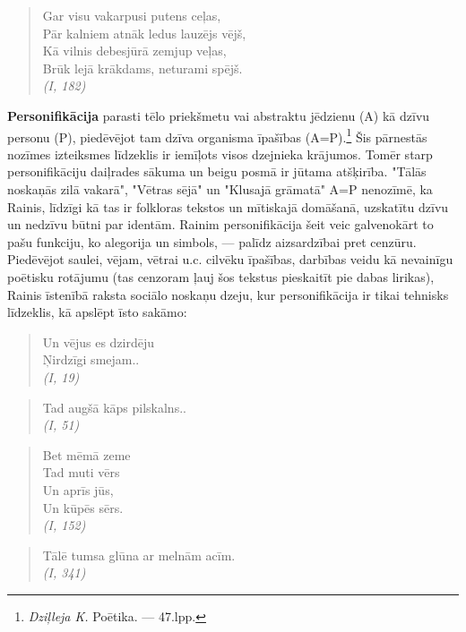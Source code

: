 \documentclass[11pt]{article}
\begin{document}
\begin{quote}
Gar visu vakarpusi putens ceļas,\\
Pār kalniem atnāk ledus lauzējs vējš,\\
Kā vilnis debesjūrā zemjup veļas,\\
Brūk lejā krākdams, neturami spējš.\\
{\em (I, 182)}
\end{quote}

{\color{red}
{\bf Personifikācija} parasti tēlo priekšmetu vai abstraktu
jēdzienu (A) kā dzīvu personu (P), piedēvējot
tam dzīva organisma īpašības (A=P).\footnote{{\em Dziļleja K.}
Poētika. --- 47.lpp.} Šis pārnestās nozīmes
izteiksmes līdzeklis ir iemīļots visos dzejnieka krājumos.
Tomēr starp personifikāciju daiļrades sākuma un beigu
posmā ir jūtama atšķirība. "Tālās noskaņās zilā vakarā",
"Vētras sējā" un "Klusajā grāmatā" A=P nenozīmē, ka
Rainis, līdzīgi kā tas ir folkloras tekstos un mītiskajā
domāšanā, uzskatītu dzīvu un nedzīvu būtni par identām.
Rainim personifikācija šeit veic galvenokārt to pašu funkciju,
ko alegorija un simbols, --- palīdz aizsardzībai pret
cenzūru. Piedēvējot saulei, vējam, vētrai u.c.
cilvēku īpašības, darbības veidu kā nevainīgu poētisku
rotājumu (tas cenzoram ļauj šos tekstus pieskaitīt pie
dabas lirikas), Rainis īstenībā raksta sociālo noskaņu dzeju,
kur personifikācija ir tikai tehnisks līdzeklis, kā
apslēpt īsto sakāmo:

\begin{quote}
Un vējus es dzirdēju\\
Ņirdzīgi smejam..\\
{\em (I, 19)}
\end{quote}

\begin{quote}
Tad augšā kāps pilskalns..\\
{\em (I, 51)}
\end{quote}

\begin{quote}
Bet mēmā zeme\\
Tad muti vērs\\
Un aprīs jūs,\\
Un kūpēs sērs.\\
{\em (I, 152)}
\end{quote}

\begin{quote}
Tālē tumsa glūna ar melnām acīm.\\
{\em (I, 341)}
\end{quote}
}
\end{document}
